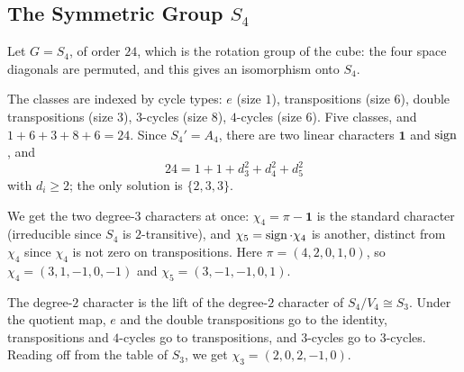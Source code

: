 \documentclass[a4paper]{scrartcl}
\begin{document}
\subsection{The Symmetric Group \texorpdfstring{$S_4$}{S4}}

Let $G = S_4$, of order $24$, which is the rotation group of the cube: the four space diagonals are permuted, and this gives an isomorphism onto $S_4$.

\begin{center}
\end{center}

The classes are indexed by cycle types: $e$ (size $1$), transpositions (size $6$), double transpositions (size $3$), $3$-cycles (size $8$), $4$-cycles (size $6$). Five classes, and $1+6+3+8+6 = 24$. Since $S_4' = A_4$, there are two linear characters $\mathbf 1$ and $\operatorname{sign}$, and
$$24 = 1 + 1 + d_3^2+d_4^2+d_5^2$$
with $d_i\geq 2$; the only solution is $\{2,3,3\}$.

We get the two degree-$3$ characters at once: $\chi_4 = \pi - \mathbf1$ is the standard character (irreducible since $S_4$ is $2$-transitive), and $\chi_5 = \operatorname{sign}\cdot\chi_4$ is another, distinct from $\chi_4$ since $\chi_4$ is not zero on transpositions. Here $\pi = (4,2,0,1,0)$, so $\chi_4 = (3,1,-1,0,-1)$ and $\chi_5 = (3,-1,-1,0,1)$.

The degree-$2$ character is the lift of the degree-$2$ character of $S_4/V_4\cong S_3$. Under the quotient map, $e$ and the double transpositions go to the identity, transpositions and $4$-cycles go to transpositions, and $3$-cycles go to $3$-cycles. Reading off from the table of $S_3$, we get $\chi_3 = (2,0,2,-1,0)$.
\end{document}
